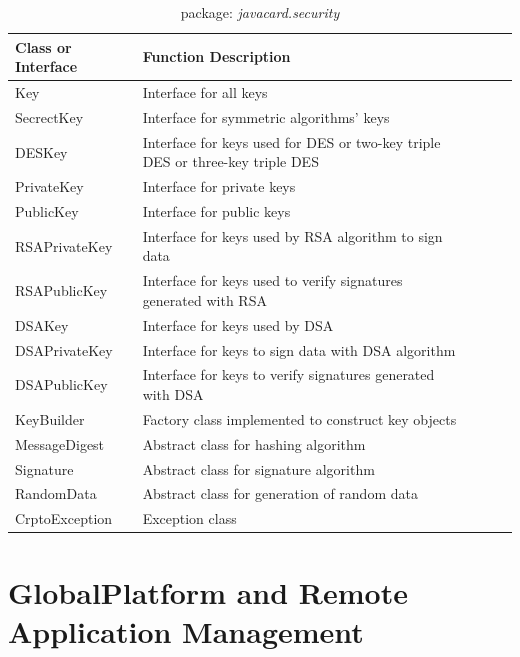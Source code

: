 \begin{table}[ht]
\caption{package: \emph{javacard.security}}
\centering
\begin{tabular}{lllll}
\hline
 Class or Interface & Function Description\\
\hline\hline
 Key &Interface for all keys   \\
 SecrectKey &Interface for symmetric algorithms' keys\\
DESKey & Interface for keys used for DES or two-key triple DES or three-key triple DES\\
PrivateKey &Interface for private keys\\
PublicKey & Interface for public keys\\
RSAPrivateKey& Interface for keys used by RSA algorithm to sign data\\
RSAPublicKey & Interface for keys used to verify signatures generated with RSA \\
DSAKey& Interface for keys used by DSA\\ 
DSAPrivateKey& Interface for keys to sign data with DSA algorithm\\
DSAPublicKey& Interface for keys to verify signatures generated with DSA\\
KeyBuilder& Factory class implemented to construct key objects\\
MessageDigest& Abstract class for hashing algorithm\\
Signature& Abstract class for signature algorithm\\
RandomData&Abstract class for generation of random data \\
CrptoException& Exception class\\
\hline
\end{tabular}
\label{table:javacard-security}
\end{table}


\section{GlobalPlatform and Remote Application Management}

